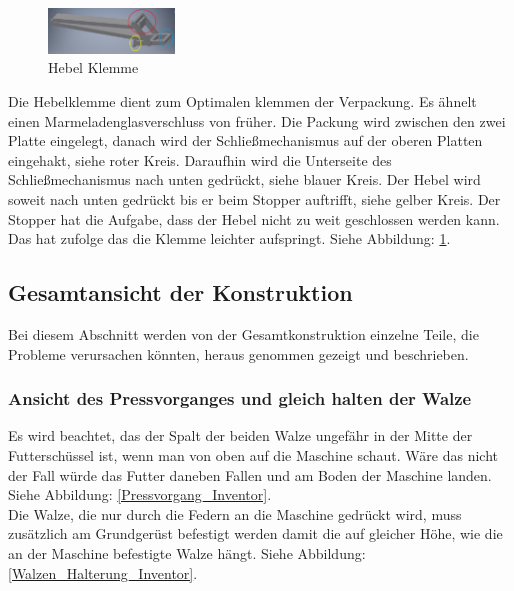 \begin{figure}
\vspace{-20pt}
  \begin{center}
    \includegraphics[width=0.3\textwidth]{Bilder/Inventor/Hebel_Klemme}
  \end{center}
  \caption{Hebel Klemme}
  \label{Hebel_Klemme_Inventor}
\end{figure}

Die Hebelklemme dient zum Optimalen klemmen der Verpackung.
Es ähnelt einen Marmeladenglasverschluss von früher. Die Packung wird zwischen den zwei Platte eingelegt, danach wird der Schließmechanismus auf der oberen Platten eingehakt, siehe roter Kreis. Daraufhin wird die Unterseite des Schließmechanismus nach unten gedrückt, siehe blauer Kreis.
Der Hebel wird soweit nach unten gedrückt bis er beim Stopper auftrifft, siehe gelber Kreis. Der Stopper hat die Aufgabe, dass der Hebel nicht zu weit geschlossen werden kann. Das hat zufolge das die Klemme leichter aufspringt. Siehe Abbildung: \ref{Hebel_Klemme_Inventor}.



\subsection{Gesamtansicht der Konstruktion}

Bei diesem Abschnitt werden von der Gesamtkonstruktion einzelne Teile, die Probleme verursachen könnten, heraus genommen gezeigt und beschrieben.

\subsubsection{Ansicht des Pressvorganges und gleich halten der Walze}

Es wird beachtet, das der Spalt der beiden Walze ungefähr in der Mitte der Futterschüssel ist, wenn man von oben auf die Maschine schaut. Wäre das nicht der Fall würde das Futter daneben Fallen und am Boden der Maschine landen. Siehe Abbildung: \ref{Pressvorgang_Inventor}.\\

Die Walze, die nur durch die Federn an die Maschine gedrückt wird, muss zusätzlich am Grundgerüst befestigt werden damit die auf gleicher Höhe, wie die an der Maschine befestigte Walze hängt. Siehe Abbildung: \ref{Walzen_Halterung_Inventor}.

